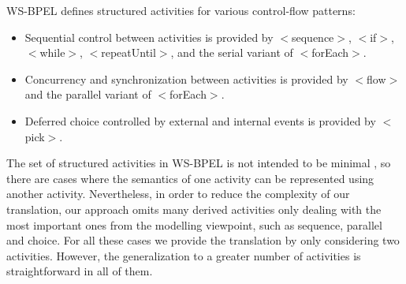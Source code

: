 WS-BPEL defines structured activities for various control-flow patterns:
\begin{itemize} 
\item Sequential control between activities is provided by $<$sequence$>$, $<$if$>$, \linebreak $<$while$>$, 
$<$repeatUntil$>$, and the serial variant of $<$forEach$>$. 
\item Concurrency and synchronization between activities is provided by $<$flow$>$ and the 
parallel variant of $<$forEach$>$.  
\item Deferred choice controlled by external and internal events is provided by $<$pick$>$.  
\end{itemize}
The set of structured activities in WS-BPEL is not intended to be minimal \cite{BPEL4WS}, so there are cases where 
the semantics of one activity can be represented using another activity. Nevertheless, in order to reduce the complexity
of our translation, our approach omits many derived activities only dealing with the most important ones from the modelling viewpoint,
such as sequence, parallel and choice. For all these cases we provide the translation
by only considering two activities. However, the generalization
to a greater number of activities is straightforward in all
of them. 
